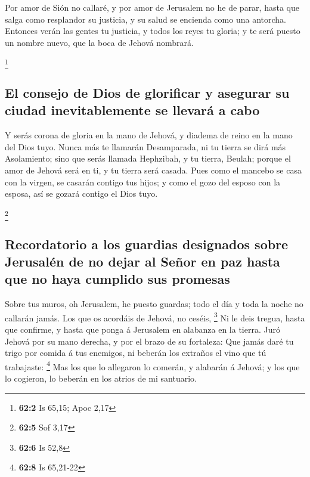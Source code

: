  Por amor de Sión no callaré, y por amor de Jerusalem no
he de parar, hasta que salga como resplandor su justicia, y su salud se
encienda como una antorcha.  Entonces verán las gentes tu
justicia, y todos los reyes tu gloria; y te será puesto un nombre nuevo,
que la boca de Jehová nombrará.

\footnote{\textbf{62:2} Is 65,15; Apoc 2,17}

\hypertarget{el-consejo-de-dios-de-glorificar-y-asegurar-su-ciudad-inevitablemente-se-llevaruxe1-a-cabo}{%
\subsection{El consejo de Dios de glorificar y asegurar su ciudad
inevitablemente se llevará a
cabo}\label{el-consejo-de-dios-de-glorificar-y-asegurar-su-ciudad-inevitablemente-se-llevaruxe1-a-cabo}}

 Y serás corona de gloria en la mano de Jehová, y diadema
de reino en la mano del Dios tuyo.  Nunca más te llamarán
Desamparada, ni tu tierra se dirá más Asolamiento; sino que serás
llamada Hephzibah, y tu tierra, Beulah; porque el amor de Jehová será en
ti, y tu tierra será casada.  Pues como el mancebo se casa
con la virgen, se casarán contigo tus hijos; y como el gozo del esposo
con la esposa, así se gozará contigo el Dios tuyo.

\footnote{\textbf{62:5} Sof 3,17}

\hypertarget{recordatorio-a-los-guardias-designados-sobre-jerusaluxe9n-de-no-dejar-al-seuxf1or-en-paz-hasta-que-no-haya-cumplido-sus-promesas}{%
\subsection{Recordatorio a los guardias designados sobre Jerusalén de no
dejar al Señor en paz hasta que no haya cumplido sus
promesas}\label{recordatorio-a-los-guardias-designados-sobre-jerusaluxe9n-de-no-dejar-al-seuxf1or-en-paz-hasta-que-no-haya-cumplido-sus-promesas}}

 Sobre tus muros, oh Jerusalem, he puesto guardas; todo el
día y toda la noche no callarán jamás. Los que os acordáis de Jehová, no
ceséis, \footnote{\textbf{62:6} Is 52,8}  Ni le deis
tregua, hasta que confirme, y hasta que ponga á Jerusalem en alabanza en
la tierra.  Juró Jehová por su mano derecha, y por el
brazo de su fortaleza: Que jamás daré tu trigo por comida á tus
enemigos, ni beberán los extraños el vino que tú trabajaste: \footnote{\textbf{62:8}
  Is 65,21-22}  Mas los que lo allegaron lo comerán, y
alabarán á Jehová; y los que lo cogieron, lo beberán en los atrios de mi
santuario.

